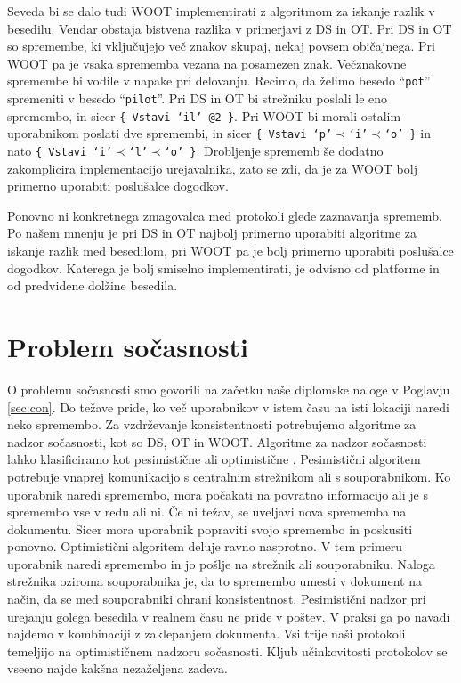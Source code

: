 \documentclass[a4paper, 12pt, twoside]{book}
\begin{document}
Seveda bi se dalo tudi WOOT implementirati z algoritmom za iskanje razlik v besedilu. Vendar obstaja bistvena razlika v primerjavi z DS in OT. Pri DS in OT so spremembe, ki vključujejo več znakov skupaj, nekaj povsem običajnega. Pri WOOT pa je vsaka sprememba vezana na posamezen znak. Večznakovne spremembe bi vodile v napake pri delovanju. Recimo, da želimo besedo “{\tt pot}” spremeniti v besedo “{\tt pilot}”. Pri DS in OT bi strežniku poslali le eno spremembo, in sicer {\tt \{ Vstavi ‘il’ @2 \}}. Pri WOOT bi morali ostalim uporabnikom poslati dve spremembi, in sicer {\tt \{ Vstavi ‘p’$\prec$‘i’$\prec$‘o’ \}} in nato {\tt \{ Vstavi ‘i’$\prec$‘l’$\prec$‘o’ \}}. Drobljenje sprememb še dodatno zakomplicira implementacijo urejavalnika, zato se zdi, da je za WOOT bolj primerno uporabiti poslušalce dogodkov.

Ponovno ni konkretnega zmagovalca med protokoli glede zaznavanja sprememb. Po našem mnenju je pri DS in OT najbolj primerno uporabiti algoritme za iskanje razlik med besedilom, pri WOOT pa je bolj primerno uporabiti poslušalce dogodkov. Katerega je bolj smiselno implementirati, je odvisno od platforme in od predvidene dolžine besedila.

\section{Problem sočasnosti}

O problemu sočasnosti smo govorili na začetku naše diplomske naloge v Poglavju \ref{sec:con}. Do težave pride, ko več uporabnikov v istem času na isti lokaciji naredi neko spremembo. Za vzdrževanje konsistentnosti potrebujemo algoritme za nadzor sočasnosti, kot so DS, OT in WOOT.  Algoritme za nadzor sočasnosti lahko klasificiramo kot pesimistične ali optimistične \cite{hllbw}. Pesimistični algoritem potrebuje vnaprej komunikacijo s centralnim strežnikom ali s souporabnikom. Ko uporabnik naredi spremembo, mora počakati na povratno informacijo ali je s spremembo vse v redu ali ni. Če ni težav, se uveljavi nova sprememba na dokumentu. Sicer mora uporabnik popraviti svojo spremembo in poskusiti ponovno. Optimistični algoritem deluje ravno nasprotno. V tem primeru uporabnik naredi spremembo in jo pošlje na strežnik ali souporabniku. Naloga strežnika oziroma souporabnika je, da to spremembo umesti v dokument na način, da se med souporabniki ohrani konsistentnost. Pesimistični nadzor pri urejanju golega besedila v realnem času ne pride v poštev. V praksi ga po navadi najdemo v kombinaciji z zaklepanjem dokumenta. Vsi trije naši protokoli temeljijo na optimističnem nadzoru sočasnosti. Kljub učinkovitosti protokolov se vseeno najde kakšna nezaželjena zadeva.
\end{document}
